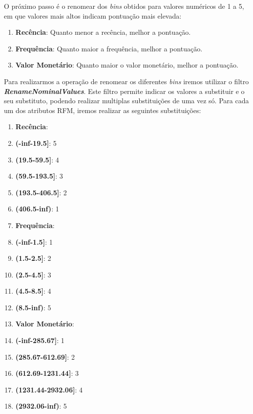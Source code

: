 \documentclass{easychair}
\begin{document}
O próximo passo é o renomear dos \textit{bins} obtidos para valores numéricos de 1 a 5, em que valores mais altos indicam pontuação mais elevada:

\begin{enumerate}
	\item[\textbullet] \textbf{Recência}: Quanto menor a recência, melhor a pontuação.
	\item[\textbullet] \textbf{Frequência}: Quanto maior a frequência, melhor a pontuação.
	\item[\textbullet] \textbf{Valor Monetário}: Quanto maior o valor monetário, melhor a pontuação.
\end{enumerate}

Para realizarmos a operação de renomear os diferentes \textit{bins} iremos utilizar o filtro \textit{\textbf{RenameNominalValues}}. Este filtro permite indicar os valores a substituir e o seu substituto, podendo realizar multiplas substituições de uma vez só. Para cada um dos atributos RFM, iremos realizar as seguintes substituições:

\begin{enumerate}
	\item \textbf{Recência}:
		\item[\textbullet] \textbf{(-inf-19.5]}: 5
		\item[\textbullet] \textbf{(19.5-59.5]}: 4
		\item[\textbullet] \textbf{(59.5-193.5]}: 3
		\item[\textbullet] \textbf{(193.5-406.5]}: 2
		\item[\textbullet] \textbf{(406.5-inf)}: 1

\newpage

	\item \textbf{Frequência}:
		\item[\textbullet] \textbf{(-inf-1.5]}: 1
		\item[\textbullet] \textbf{(1.5-2.5]}: 2
		\item[\textbullet] \textbf{(2.5-4.5]}: 3
		\item[\textbullet] \textbf{(4.5-8.5]}: 4
		\item[\textbullet] \textbf{(8.5-inf)}: 5
	\item \textbf{Valor Monetário}:
		\item[\textbullet] \textbf{(-inf-285.67]}: 1
		\item[\textbullet] \textbf{(285.67-612.69]}: 2
		\item[\textbullet] \textbf{(612.69-1231.44]}: 3
		\item[\textbullet] \textbf{(1231.44-2932.06]}: 4
		\item[\textbullet] \textbf{(2932.06-inf)}: 5
\end{enumerate}
\end{document}
